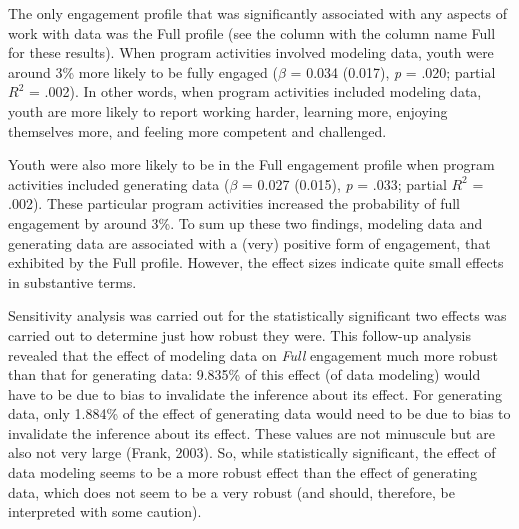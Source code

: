 \documentclass[]{msu-thesis}
\theoremstyle{definition}
\theoremstyle{definition}
\theoremstyle{definition}
\theoremstyle{remark}
\begin{document}
The only engagement profile that was significantly associated with any
aspects of work with data was the Full profile (see the column with the
column name Full for these results). When program activities involved
modeling data, youth were around 3\% more likely to be fully engaged
(\(\beta\) = 0.034 (0.017), \emph{p} = .020; partial \(R^2\) = .002). In
other words, when program activities included modeling data, youth are
more likely to report working harder, learning more, enjoying themselves
more, and feeling more competent and challenged.

Youth were also more likely to be in the Full engagement profile when
program activities included generating data (\(\beta\) = 0.027 (0.015),
\emph{p} = .033; partial \(R^2\) = .002). These particular program
activities increased the probability of full engagement by around 3\%.
To sum up these two findings, modeling data and generating data are
associated with a (very) positive form of engagement, that exhibited by
the Full profile. However, the effect sizes indicate quite small effects
in substantive terms.

Sensitivity analysis was carried out for the statistically significant
two effects was carried out to determine just how robust they were. This
follow-up analysis revealed that the effect of modeling data on
\emph{Full} engagement much more robust than that for generating data:
9.835\% of this effect (of data modeling) would have to be due to bias
to invalidate the inference about its effect. For generating data, only
1.884\% of the effect of generating data would need to be due to bias to
invalidate the inference about its effect. These values are not
minuscule but are also not very large (Frank, 2003). So, while
statistically significant, the effect of data modeling seems to be a
more robust effect than the effect of generating data, which does not
seem to be a very robust (and should, therefore, be interpreted with
some caution).
\end{document}
